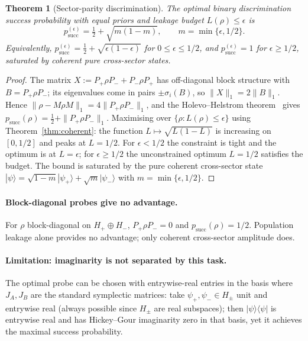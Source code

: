 \documentclass[a4paper,onecolumn,noarxiv]{quantumarticle}
\theoremstyle{plain}
\newtheorem{theorem}{Theorem}
\theoremstyle{definition}
\theoremstyle{remark}
\newcommand{\Pplus}{P_{+}}
\newcommand{\Pminus}{P_{-}}
\newcommand{\Hplus}{H_{+}}
\newcommand{\Hminus}{H_{-}}
\newcommand{\Mop}{M}
\newcommand{\Lleak}{L}
\begin{document}
\begin{theorem}[Sector-parity discrimination]
\label{thm:discrimination}
The optimal binary discrimination success probability with equal priors and leakage
budget $\Lleak(\rho)\le\epsilon$ is
\begin{equation}
  p_{\mathrm{succ}}^{(\epsilon)} = \tfrac{1}{2}+\sqrt{m(1-m)},\qquad
  m=\min\{\epsilon,1/2\}.
\end{equation}
Equivalently, $p_{\mathrm{succ}}^{(\epsilon)}=\tfrac{1}{2}+\sqrt{\epsilon(1-\epsilon)}$
for $0\le\epsilon\le 1/2$, and $p_{\mathrm{succ}}^{(\epsilon)}=1$ for
$\epsilon\ge 1/2$, saturated by coherent pure cross-sector states.
\end{theorem}

\begin{proof}
The matrix $X:=\Pplus\rho\Pminus+\Pminus\rho\Pplus$ has off-diagonal block structure
with $B=\Pplus\rho\Pminus$; its eigenvalues come in pairs $\pm\sigma_i(B)$, so
$\|X\|_1=2\|B\|_1$. Hence $\|\rho-\Mop\rho\Mop\|_1=4\|\Pplus\rho\Pminus\|_1$,
and the Holevo--Helstrom theorem~\cite{Helstrom1976} gives
$p_{\mathrm{succ}}(\rho)=\tfrac{1}{2}+\|\Pplus\rho\Pminus\|_1$. Maximising over
$\{\rho:\Lleak(\rho)\le\epsilon\}$ using Theorem~\ref{thm:coherent}: the function
$\Lleak\mapsto\sqrt{\Lleak(1-\Lleak)}$ is increasing on $[0,1/2]$ and peaks at
$\Lleak=1/2$. For $\epsilon<1/2$ the constraint is tight and the optimum is at
$\Lleak=\epsilon$; for $\epsilon\ge 1/2$ the unconstrained optimum $\Lleak=1/2$
satisfies the budget. The bound is saturated by the pure coherent cross-sector state
$|\psi\rangle=\sqrt{1-m}|\psi_+\rangle+\sqrt{m}|\psi_-\rangle$ with
$m=\min\{\epsilon,1/2\}$.
\end{proof}

\paragraph{Block-diagonal probes give no advantage.} For $\rho$ block-diagonal on
$\Hplus\oplus\Hminus$, $\Pplus\rho\Pminus=0$ and $p_{\mathrm{succ}}(\rho)=1/2$.
Population leakage alone provides no advantage; only coherent cross-sector amplitude
does.

\paragraph{Limitation: imaginarity is not separated by this task.} The optimal probe
can be chosen with entrywise-real entries in the basis where $J_A,J_B$ are the
standard symplectic matrices: take $\psi_+,\psi_-\in H_\pm$ unit and entrywise real
(always possible since $H_\pm$ are real subspaces); then $|\psi\rangle\langle\psi|$
is entrywise real and has Hickey--Gour imaginarity zero in that basis, yet it achieves
the maximal success probability.
\end{document}
